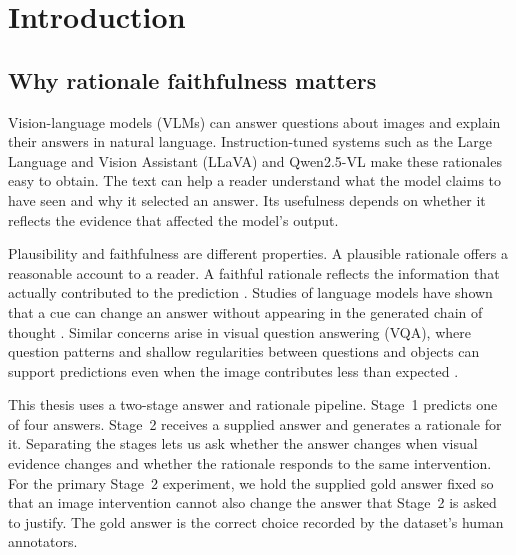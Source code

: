 
\chapter{Introduction}
\label{ch:introduction}

\section{Why rationale faithfulness matters}
\label{sec:intro-motivation}

Vision-language models (VLMs) can answer questions about images and explain
their answers in natural language. Instruction-tuned systems such as the Large
Language and Vision Assistant (LLaVA) \citep{DBLP:conf/nips/LiuLWL23a} and
Qwen2.5-VL \citep{DBLP:journals/corr/abs-2502-13923} make these rationales easy
to obtain.
The text can help a reader understand what the model claims to have seen and why
it selected an answer. Its usefulness depends on whether it reflects the
evidence that affected the model's output.

Plausibility and faithfulness are different properties. A plausible rationale
offers a reasonable account to a reader. A faithful rationale reflects the
information that actually contributed to the prediction
\citep{DBLP:conf/acl/JacoviG20}. Studies of language models have shown that a
cue can change an answer without appearing in the generated chain of thought
\citep{DBLP:conf/nips/TurpinMPB23}. Similar concerns arise in visual question
answering (VQA), where question patterns and shallow regularities between questions and
objects can support predictions even when the image contributes less than
expected \citep{DBLP:conf/iccv/DancetteCTC21,DBLP:conf/emnlp/SiMZLL0CWZ22}.

This thesis uses a two-stage answer and rationale pipeline. Stage~1 predicts one
of four answers. Stage~2 receives a supplied answer and generates a rationale
for it. Separating the stages lets us ask whether the answer changes when visual
evidence changes and whether the rationale responds to the same intervention.
For the primary Stage~2 experiment, we hold the supplied gold answer fixed so
that an image intervention cannot also change the answer that Stage~2 is asked
to justify. The gold answer is the correct choice recorded by the dataset's
human annotators.

